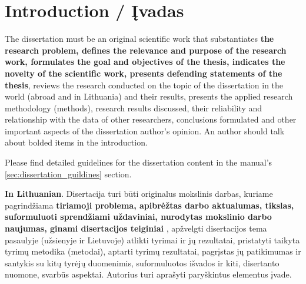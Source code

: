     

\chapter*{Introduction / Įvadas}
\label{cha:intro_lt}

The dissertation must be an original scientific work that substantiates \textbf{the research problem, defines the relevance and purpose of the research work, formulates the goal and objectives of the thesis, indicates the novelty of the scientific work, presents defending statements of the thesis}, reviews the research conducted on the topic of the dissertation in the world (abroad and in Lithuania) and their results, presents the applied research methodology (methods), research results discussed, their reliability and relationship with the data of other researchers, conclusions formulated and other important aspects of the dissertation author's opinion. 
An author should talk about bolded items in the introduction.

Please find detailed guidelines for the dissertation content in the manual's \ref{sec:dissertation_guildines} section.

\textbf{In Lithuanian}. Disertacija turi būti originalus mokslinis darbas, kuriame pagrindžiama \textbf{tiriamoji problema, apibrėžtas darbo aktualumas, tikslas, suformuluoti sprendžiami uždaviniai, nurodytas mokslinio darbo naujumas, ginami disertacijos teiginiai} , apžvelgti disertacijos tema pasaulyje (užsienyje ir Lietuvoje) atlikti tyrimai ir jų rezultatai, pristatyti taikyta tyrimų metodika (metodai), aptarti tyrimų rezultatai, pagrįstas jų patikimumas ir santykis su kitų tyrėjų duomenimis, suformuluotos išvados ir kiti, disertanto nuomone, svarbūs aspektai.
Autorius turi aprašyti paryškintus elementus įvade.


